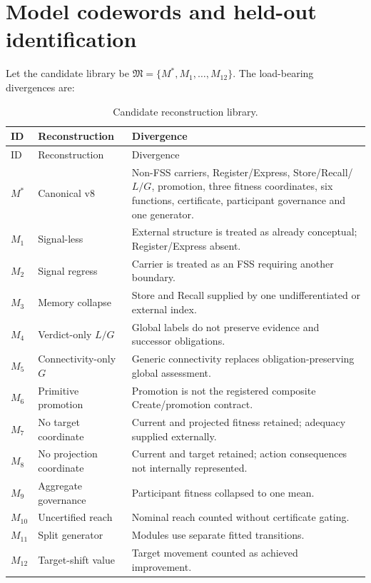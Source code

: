 \documentclass[10pt]{article}
\begin{document}
\section{Model codewords and held-out identification}
Let the candidate library be $\mathfrak M=\{M^*,M_1,\ldots,M_{12}\}$. The load-bearing divergences are:
\begin{longtable}{p{}p{}p{}}
\caption{Candidate reconstruction library.}\label{tab:candidates}\\
\toprule ID & Reconstruction & Divergence \\
\midrule\endfirsthead
\toprule ID & Reconstruction & Divergence \\
\midrule\endhead
$M^*$ & Canonical v8 & Non-FSS carriers, Register/Express, Store/Recall/$L/G$, promotion, three fitness coordinates, six functions, certificate, participant governance and one generator.\\
$M_1$ & Signal-less & External structure is treated as already conceptual; Register/Express absent.\\
$M_2$ & Signal regress & Carrier is treated as an FSS requiring another boundary.\\
$M_3$ & Memory collapse & Store and Recall supplied by one undifferentiated or external index.\\
$M_4$ & Verdict-only $L/G$ & Global labels do not preserve evidence and successor obligations.\\
$M_5$ & Connectivity-only $G$ & Generic connectivity replaces obligation-preserving global assessment.\\
$M_6$ & Primitive promotion & Promotion is not the registered composite Create/promotion contract.\\
$M_7$ & No target coordinate & Current and projected fitness retained; adequacy supplied externally.\\
$M_8$ & No projection coordinate & Current and target retained; action consequences not internally represented.\\
$M_9$ & Aggregate governance & Participant fitness collapsed to one mean.\\
$M_{10}$ & Uncertified reach & Nominal reach counted without certificate gating.\\
$M_{11}$ & Split generator & Modules use separate fitted transitions.\\
$M_{12}$ & Target-shift value & Target movement counted as achieved improvement.\\
\bottomrule
\end{longtable}
\end{document}
